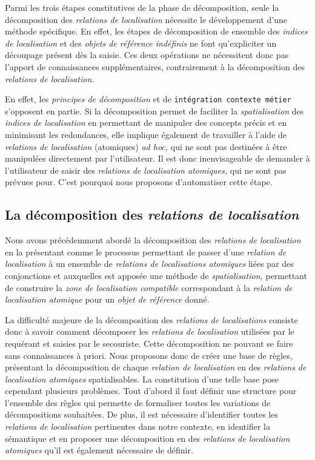Parmi les trois étapes constitutives de la phase de décomposition,
seule la décomposition des \emph{relations de localisation} nécessite
le développement d'une méthode spécifique. En effet, les étapes de
décomposition de ensemble des \emph{indices de localisation} et des
\emph{objets de référence indéfinis} ne font qu'expliciter un
découpage présent dès la saisie. Ces deux opérations ne nécessitent
donc pas l'apport de connaissances supplémentaires, contrairement à la
décomposition des \emph{relations de localisation.}

En effet, les \emph{principes de décomposition} et de
\texttt{intégration contexte métier} s'opposent en partie. Si la
décomposition permet de faciliter la \emph{spatialisation} des
\emph{indices de localisation} en permettant de manipuler des concepts
précis et en minimisant les redondances, elle implique également de
travailler à l'aide de \emph{relations de localisation} (atomiques)
\emph{ad hoc,} qui ne sont pas destinées à être manipulées directement
par l'utilisateur. Il est donc inenvisageable de demander à
l'utilisateur de saisir des \emph{relations de localisation
  atomiques,} qui ne sont pas prévues pour. C'est pourquoi nous
proposons d'automatiser cette étape.

\subsection{La décomposition des \emph{relations de localisation}}

Nous avons précédemment abordé la décomposition des \emph{relations de
  localisation} en la présentant comme le processus permettant de
passer d'une \emph{relation de localisation} à un ensemble de
\emph{relations de localisations atomiques} liées par des conjonctions
et auxquelles est apposée une méthode de \emph{spatialisation,}
permettant de construire la \emph{zone de localisation compatible}
correspondant à la \emph{relation de localisation atomique} pour un
\emph{objet de référence} donné.



La difficulté majeure de la décomposition des \emph{relations de
  localisations} consiste donc à savoir comment décomposer les
\emph{relations de localisation} utilisées par le requérant et saisies
par le secouriste. Cette décomposition ne pouvant se faire sans
connaissances à priori. Nous proposons donc de créer une base de
règles, présentant la décomposition de chaque \emph{relation de
  localisation} en des \emph{relations de localisation atomiques}
spatialisables. La constitution d'une telle base pose cependant
plusieurs problèmes. Tout d'abord il faut définir une structure pour
l'ensemble des règles qui permette de formaliser toutes les variations
de décompositions souhaitées. De plus, il est nécessaire d'identifier
toutes les \emph{relations de localisation} pertinentes dans notre
contexte, en identifier la sémantique et en proposer une décomposition
en des \emph{relations de localisation atomiques} qu'il est également
nécessaire de définir.

